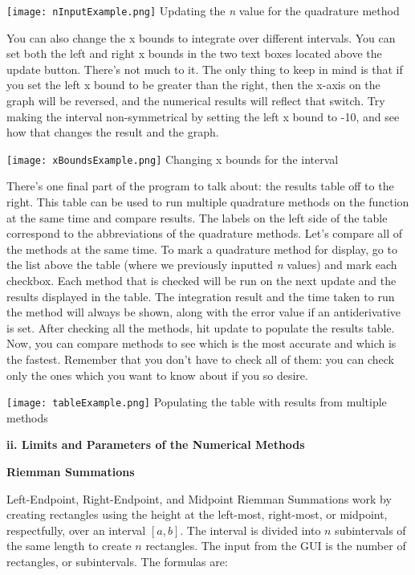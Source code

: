 \documentclass[12pt]{article}
\newcommand{\newLine}{\vspace{5mm}}
\newcommand{\nextsubsection}[1]{\newLine \noindent \large \textbf{#1} \normalsize}
\begin{document}
\begin{center}
\texttt{[image: nInputExample.png]}
\small Updating the \emph{n} value for the quadrature method
\normalsize
\end{center}

\newLine You can also change the x bounds to integrate over different intervals. You can set both the left and right x bounds in the two text boxes located above the update button. There's not much to it. The only thing to keep in mind is that if you set the left x bound to be greater than the right, then the x-axis on the graph will be reversed, and the numerical results will reflect that switch. Try making the interval non-symmetrical by setting the left x bound to -10, and see how that changes the result and the graph.

\begin{center}
\texttt{[image: xBoundsExample.png]}
\small Changing x bounds for the interval
\normalsize
\end{center}

\newLine There's one final part of the program to talk about: the results table off to the right. This table can be used to run multiple quadrature methods on the function at the same time and compare results. The labels on the left side of the table correspond to the abbreviations of the quadrature methods. Let's compare all of the methods at the same time. To mark a quadrature method for display, go to the list above the table (where we previously inputted \emph{n} values) and mark each checkbox. Each method that is checked will be run on the next update and the results displayed in the table. The integration result and the time taken to run the method will always be shown, along with the error value if an antiderivative is set. After checking all the methods, hit update to populate the results table. Now, you can compare methods to see which is the most accurate and which is the fastest. Remember that you don't have to check all of them: you can check only the ones which you want to know about if you so desire.

\begin{center}
\texttt{[image: tableExample.png]}
\small Populating the table with results from multiple methods
\normalsize
\end{center}

\nextsubsection{ii. Limits and Parameters of the Numerical Methods}

\newLine\noindent  \textbf{Riemman Summations}

Left-Endpoint, Right-Endpoint, and Midpoint Riemman Summations work by creating rectangles using the height at the left-most, right-most, or midpoint, respectfully, over an interval $[a,b]$. The interval is divided into $n$ subintervals of the same length to create $n$ rectangles. The input from the GUI is the number of rectangles, or subintervals. The formulas are:
\end{document}
